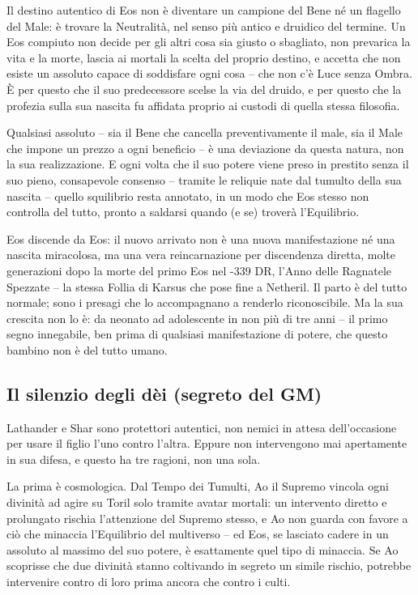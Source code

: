 Il destino autentico di Eos non è diventare un campione del Bene né un flagello del Male: è trovare la Neutralità, nel senso più antico e druidico del termine. Un Eos compiuto non decide per gli altri cosa sia giusto o sbagliato, non prevarica la vita e la morte, lascia ai mortali la scelta del proprio destino, e accetta che non esiste un assoluto capace di soddisfare ogni cosa -- che non c'è Luce senza Ombra. È per questo che il suo predecessore scelse la via del druido, e per questo che la profezia sulla sua nascita fu affidata proprio ai custodi di quella stessa filosofia.

Qualsiasi assoluto -- sia il Bene che cancella preventivamente il male, sia il Male che impone un prezzo a ogni beneficio -- è una deviazione da questa natura, non la sua realizzazione. E ogni volta che il suo potere viene preso in prestito senza il suo pieno, consapevole consenso -- tramite le reliquie nate dal tumulto della sua nascita -- quello squilibrio resta annotato, in un modo che Eos stesso non controlla del tutto, pronto a saldarsi quando (e se) troverà l'Equilibrio.

Eos discende da Eos: il nuovo arrivato non è una nuova manifestazione né una nascita miracolosa, ma una vera reincarnazione per discendenza diretta, molte generazioni dopo la morte del primo Eos nel -339 DR, l'Anno delle Ragnatele Spezzate -- la stessa Follia di Karsus che pose fine a Netheril. Il parto è del tutto normale; sono i presagi che lo accompagnano a renderlo riconoscibile. Ma la sua crescita non lo è: da neonato ad adolescente in non più di tre anni -- il primo segno innegabile, ben prima di qualsiasi manifestazione di potere, che questo bambino non è del tutto umano.

\subsection{Il silenzio degli dèi (segreto del GM)}

Lathander e Shar sono protettori autentici, non nemici in attesa dell'occasione per usare il figlio l'uno contro l'altra. Eppure non intervengono mai apertamente in sua difesa, e questo ha tre ragioni, non una sola.

La prima è cosmologica. Dal Tempo dei Tumulti, Ao il Supremo vincola ogni divinità ad agire su Toril solo tramite avatar mortali: un intervento diretto e prolungato rischia l'attenzione del Supremo stesso, e Ao non guarda con favore a ciò che minaccia l'Equilibrio del multiverso -- ed Eos, se lasciato cadere in un assoluto al massimo del suo potere, è esattamente quel tipo di minaccia. Se Ao scoprisse che due divinità stanno coltivando in segreto un simile rischio, potrebbe intervenire contro di loro prima ancora che contro i culti.

